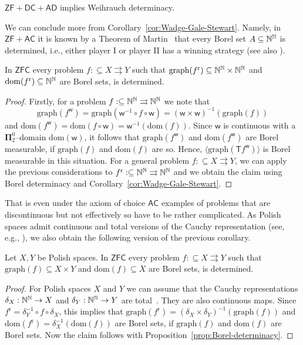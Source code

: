 \documentclass{amsart}
\def\IN{{\Bbb{N}}}
\def\In{\subseteq}
\def\mto{\rightrightarrows}
\def\T{{\mathsf{{T}}}}
\def\w{{\mathsf{{w}}}}
\def\w{\mathsf{w}}
\def\dom{{\mathrm{dom}}}
\def\graph{{\mathrm{graph}}}
\newcommand{\PO}[1]{{{\mathbf\Pi}^0_{#1}}}
\def\AC{\mathsf{AC}}
\def\AD{\mathsf{AD}}
\def\ZFC{\mathsf{ZFC}}
\def\ZF{\mathsf{ZF}}
\def\DC{\mathsf{DC}}
\def\r{\mathrm{r}}
\begin{document}
\begin{corollary}[Determinacy]
\label{cor:determinacy}
$\ZF+\DC+\AD$ implies Weihrauch determinacy.
\end{corollary}

We can conclude more from Corollary~\ref{cor:Wadge-Gale-Stewart}. Namely, in $\ZF+\AC$ it is known by a Theorem of Martin~\cite[Theorem~20.5]{Kec95} that every
Borel set $A\In\IN^\IN$ is determined, i.e., either player I or player II has a winning strategy
(see also \cite[Corollary~3.6]{NP19}).

\begin{proposition}
\label{prop:Borel-determinacy}
In $\ZFC$ every problem $f:\In X\mto Y$ such that $\graph(f^\r)\In\IN^\IN\times\IN^\IN$ and $\dom(f^\r)\In\IN^\IN$ are Borel sets, is determined.
\end{proposition}
\begin{proof}
Firstly, for a problem $f:\In\IN^\IN\mto\IN^\IN$ we note that 
\[\graph(f^\w)=\graph(\w^{-1}\circ f\circ \w)=(\w\times\w)^{-1}(\graph(f))\] 
and $\dom(f^\w)=\dom(f\circ\w)=\w^{-1}(\dom(f))$.
Since $\w$ is continuous with a $\PO{2}$--domain $\dom(\w)$, it follows that $\graph(f^\w)$ and $\dom(f^\w)$ are Borel measurable, 
if $\graph(f)$ and $\dom(f)$ are so. Hence, $\langle\graph(\T f^\w)\rangle$ is Borel measurable in this situation.
For a general problem $f:\In X\mto Y$, we can apply the previous considerations to $f^\r:\In\IN^\IN\mto\IN^\IN$ and we obtain the claim
using Borel determinacy and Corollary~\ref{cor:Wadge-Gale-Stewart}.
\end{proof}

That is even under the axiom of choice $\AC$ examples of problems that are discontinuous but not effectively so have to be rather complicated.
As Polish spaces admit continuous and total versions of the Cauchy representation (see, e.g., \cite[Corollary~4.4.12]{Bra98b}),
we also obtain the following version of the previous corollary.

\begin{corollary}
\label{cor:Borel-determinacy-polish}
Let $X,Y$ be Polish spaces.
In $\ZFC$ every problem ${f:\In X\mto Y}$ such that $\graph(f)\In X\times Y$ and $\dom(f)\In X$ are Borel sets, is determined.
\end{corollary}
\begin{proof}
For Polish spaces $X$ and $Y$ we can assume that the Cauchy representations 
$\delta_X:\IN^\IN\to X$ and $\delta_Y:\IN^\IN\to Y$ are total~\cite[Corollary~4.4.12]{Bra98b}.
They are also continuous maps.
Since $f^\r=\delta_Y^{-1}\circ f\circ\delta_X$, this implies that 
$\graph(f^\r)=(\delta_X\times\delta_Y)^{-1}(\graph(f))$ and
$\dom(f^\r)=\delta_X^{-1}(\dom(f))$ are Borel sets, if $\graph(f)$ and $\dom(f)$ are Borel sets.
Now the claim follows with Proposition~\ref{prop:Borel-determinacy}.
\end{proof}
\end{document}
